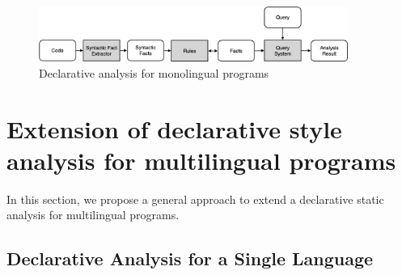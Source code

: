 \begin{figure}[t]
  \centering
  \vspace{2mm}
  \includegraphics[width=0.9\textwidth]{img/ov1.png}
  \caption{Declarative analysis for monolingual programs}
  \label{fig:ov1}
\end{figure}

\section{Extension of declarative style analysis for multilingual programs}
\label{sec:approach}

In this section, we propose a general approach to extend a declarative
static analysis for multilingual programs.

\subsection{Declarative Analysis for a Single Language}

%

